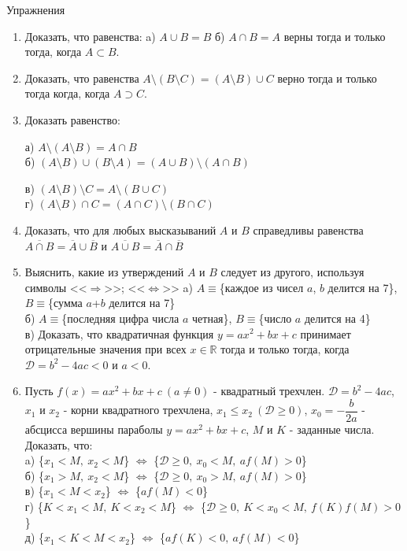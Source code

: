 \documentclass[a4paper,12pt]{article} %
\begin{document}
\begin{center}
\large Упражнения
\end{center}
\label{Exercises}
\begin{enumerate}
	\item Доказать, что равенства: a) $A \cup B=B$ б) $A \cap B=A$ верны тогда и только тогда, когда $A \subset B$.
	\item Доказать, что равенства $A \setminus (B \setminus C)=(A \setminus B) \cup C$ верно тогда и только тогда когда, когда $A \supset C$.
	\item Доказать равенство:\newline
	\begin{minipage}{0,5\textwidth}
		а) $A \setminus (A \setminus B)=A \cap B$ \\
		б) $(A \setminus B) \cup (B \setminus A)=(A \cup B) \setminus (A \cap B)$
	\end{minipage}
	\begin{minipage}{0,5\textwidth}
		в) $(A \setminus B) \setminus C = A \setminus (B \cup C)$\\
		г) $(A \setminus B) \cap C = (A \cap C) \setminus (B \cap C)$
	\end{minipage}
	\item Доказать, что для любых высказываний $A$ и $B$ справедливы равенства
	$\overline {A \cap B}=\overline {A} \cup \overline {B}$ и $\overline {A \cup B}=\overline {A} \cap \overline {B}$
	\item Выяснить, какие из утверждений $A$ и $B$ следует из другого, используя символы <<$\Rightarrow$>>; <<$\Leftrightarrow$>>\newline
	a) $A \equiv $\{каждое из чисел $a$, $b$ делится на 7\}, $B \equiv $\{сумма $a$+$b$ делится на 7\} \\
	б) $A \equiv $\{последняя цифра числа $a$ четная\}, $B \equiv$\{число $a$ делится на 4\} \\
	в) Доказать, что квадратичная функция $y=ax^2+bx+c$ принимает отрицательные 
	значения при всех $x \in \mathbb R$ тогда и только тогда, когда $\mathscr D=b^2-4ac < 0$ и $a<0$.
	\item Пусть $f(x)=ax^2+bx+c\ (a \neq 0)$ - квадратный трехчлен. $\mathscr D=b^2-4ac$, $x_1$ и $x_2$ - корни
	квадратного трехчлена, $x_1 \leqslant x_2\ (\mathscr {D} \geqslant 0)$, $x_0=-\dfrac{b}{2a}$ - абсцисса вершины параболы
	$y=ax^2+bx+c$, $M$ и $K$ - заданные числа. Доказать, что: \\
	a) \{$x_1 < M,\ x_2 < M$\} $\Leftrightarrow$ \{$\mathscr {D} \geqslant 0,\ x_0<M,\ af(M)>0$\} \\
	б) \{$x_1 > M,\ x_2 < M$\} $\Leftrightarrow$ \{$\mathscr {D} \geqslant 0,\ x_0>M,\ af(M)>0$\} \\
	в) \{$x_1 < M < x_2$\} $\Leftrightarrow$ \{$af(M) < 0$\} \\
	г) \{$K < x_1 < M,\ K < x_2 < M$\} $\Leftrightarrow$ \{$\mathscr {D} \geqslant 0,\ K < x_0 < M,\ f(K)f(M)>0$\} \\
	д) \{$x_1 < K < M < x_2$\} $\Leftrightarrow$ \{$af(K)<0,\ af(M)<0$\}
\end{enumerate}
\end{document}
